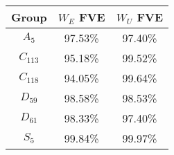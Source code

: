 \begin{tabular}{ccc}
\toprule
    Group & $W_E$ FVE & $W_U$ FVE \\
\midrule
  $A_{5}$ &   97.53\% &   97.40\% \\
$C_{113}$ &   95.18\% &   99.52\% \\
$C_{118}$ &   94.05\% &   99.64\% \\
 $D_{59}$ &   98.58\% &   98.53\% \\
 $D_{61}$ &   98.33\% &   97.40\% \\
  $S_{5}$ &   99.84\% &   99.97\% \\
\bottomrule
\end{tabular}
